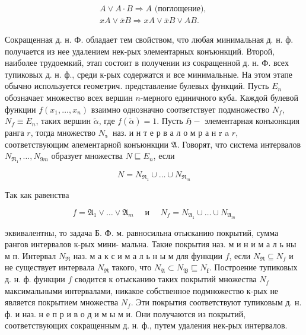 \documentclass[10pt]{article}
\begin{document}
\[

\begin{gathered}

A \vee A \cdot B \Rightarrow A \text { (поглощение), } \\

x A \vee \bar{x} B \Rightarrow x A \vee \bar{x} B \vee A B .

\end{gathered}

\]



Сокращенная д. н. Ф. обладает тем свойством, что любая минимальная д. н. ф. получается из нее удалением нек-рых элементарных конъюнкций. Второй, наиболее трудоемкий, этап состоит в получении из сокращенной д. н. Ф. всех тупиковых д. н. ф., среди к-рых содержатся и все минимальные. На этом этапе обычно используется геометрич. представление булевых функций. Пусть $E_{n}$ обозначает множество всех вершин $n$-мерного единичного куба. Каждой булевой функции $f\left(x_{1}, \ldots, x_{n}\right)$ взаимно однозначно соответствует подмножество $N_{f}$, $N_{f} \equiv E_{n}$, таких вершин $\tilde{\alpha}$, где $f(\tilde{\alpha})=1$. Пусть $\mathfrak{H}-$ элементарная конъюнкция ранга $r$, тогда множество $N_{\text {э }}$ наз. и н т е р в а л о м р а н $\mathrm{r}$ a $r$, соответствующим әлементарной конъюнкции $\mathfrak{A}$. Говорят, что система интервалов $N_{\Re_{1}}, \ldots, N_{\mathfrak{9} m}$ образует множества $N \sqsubseteq E_{n}$, если



\[

N=N_{\Re_{1}} \cup \ldots \cup N_{\Re_{m}}

\]



Так как равенства



\[

f=\mathfrak{A}_{1} \vee \ldots \vee \mathfrak{A}_{m} \quad \text { и } \quad N_{f}=N_{\mathfrak{A}_{1}} \cup \ldots \cup N_{\mathfrak{A}_{m}}

\]



эквивалентны, то задача Б. Ф. м. равносильна отысканию покрытий, сумма рангов интервалов к-рых мини- мальна. Такие покрытия наз. м и н и м а л ь ны м п. Интервал $N_{\Re}$ наз. м а к с и м а л ь н ы м для функции $f$, если $N_{\mathfrak{\Re}} \subseteq N_{f}$ и не существует интервала $N_{\mathfrak{R}}$ такого, что $N_{\mathfrak{A}} \subset N_{\mathfrak{B}} \sqsubseteq N_{\boldsymbol{f}}$. Построение тупиковых д. н. ф. функции $f$ сводится к отысканию таких покрытий множества $N_{f}$ максимальными интервалами, никакое собственное подмножество к-рых не является покрытием множества $N_{f}$. Эти покрытия соответствуют тупиковым д. н. ф. и наз. н е п р и в о д и м ы м и. Они получаются из покрытий, соответствующих сокращенным д. н. ф., путем удаления нек-рых интервалов.
\end{document}
